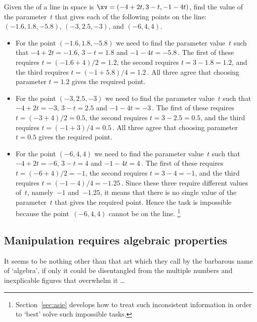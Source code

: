 \begin{example} \label{eg:}
Given the  of a line in space is \(\xv=(-4+2t,3-t,-1-4t)\), find the value of the parameter~\(t\) that gives each of the following points on the line: \((-1.6,1.8,-5.8)\), \((-3,2.5,-3)\), and \((-6,4,4)\).
\begin{solution} 
\begin{itemize}
\item For the point \((-1.6,1.8,-5.8)\) we need to find the parameter value~\(t\) such that \(-4+2t=-1.6\), \(3-t=1.8\) and \(-1-4t=-5.8\)\,.
The first of these requires \(t=(-1.6+4)/2=1.2\), the second requires \(t=3-1.8=1.2\), and the third requires \(t=(-1+5.8)/4=1.2\)\,.
All three agree that choosing parameter \(t=1.2\) gives the required point.

\item For the point \((-3,2.5,-3)\) we need to find the parameter value~\(t\) such that \(-4+2t=-3\), \(3-t=2.5\) and \(-1-4t=-3\)\,.
The first of these requires \(t=(-3+4)/2=0.5\), the second requires \(t=3-2.5=0.5\), and the third requires \(t=(-1+3)/4=0.5\)\,.
All three agree that choosing parameter \(t=0.5\) gives the required point.

\item For the point \((-6,4,4)\) we need to find the parameter value~\(t\) such that \(-4+2t=-6\), \(3-t=4\) and \(-1-4t=4\)\,.
The first of these requires \(t=(-6+4)/2=-1\), the second requires \(t=3-4=-1\), and the third requires \(t=(-1-4)/4=-1.25\)\,.
Since these three require different values of~\(t\), namely~\(-1\) and~\(-1.25\), it means that there is no single value of the parameter~\(t\) that gives the required point.
Hence the task is impossible because the point~\((-6,4,4)\) cannot be on the line.
\footnote{Section~\ref{sec:asie} develops how to treat such inconsistent information in order to `best' solve such impossible tasks.}

\end{itemize}
\end{solution}
\end{example}






\subsection{Manipulation requires algebraic properties}
\label{sec:mrap}

\begin{quoted}{}
It seems to be nothing other than that art which they call by the barbarous name of `algebra', if only it could be disentangled from the multiple numbers and inexplicable figures that overwhelm it \ldots
\end{quoted}

